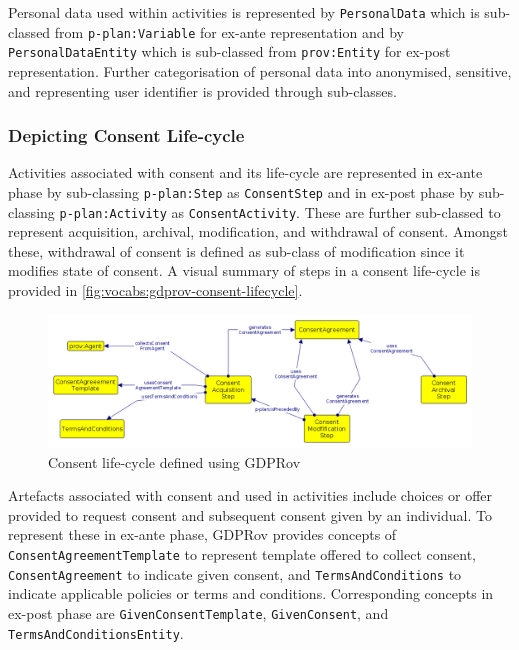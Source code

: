 Personal data used within activities is represented by \texttt{PersonalData} which is sub-classed from \texttt{p-plan:Variable} for ex-ante representation and by \texttt{PersonalDataEntity} which is sub-classed from \texttt{prov:Entity} for ex-post representation.
Further categorisation of personal data into anonymised, sensitive, and representing user identifier is provided through sub-classes.

\subsubsection{Depicting Consent Life-cycle}
Activities associated with consent and its life-cycle are represented in ex-ante phase by sub-classing \texttt{p-plan:Step} as \texttt{ConsentStep} and in ex-post phase by sub-classing \texttt{p-plan:Activity} as \texttt{ConsentActivity}.
These are further sub-classed to represent acquisition, archival, modification, and withdrawal of consent.
Amongst these, withdrawal of consent is defined as sub-class of modification since it modifies state of consent.
A visual summary of steps in a consent life-cycle is provided in \autoref{fig:vocabs:gdprov-consent-lifecycle}.
\begin{figure}[htbp]
    \centering
    \includegraphics[width=\linewidth]{img/GDPRov_consent_lifecycle.png}
    \caption{Consent life-cycle defined using GDPRov}
    \label{fig:vocabs:gdprov-consent-lifecycle}
\end{figure}

Artefacts associated with consent and used in activities include choices or offer provided to request consent and subsequent consent given by an individual.
To represent these in ex-ante phase, GDPRov provides concepts of \texttt{ConsentAgreementTemplate} to represent template offered to collect consent, \texttt{ConsentAgreement} to indicate given consent, and \texttt{TermsAndConditions} to indicate applicable policies or terms and conditions.
Corresponding concepts in ex-post phase are \texttt{GivenConsentTemplate}, \texttt{GivenConsent}, and \texttt{TermsAndConditionsEntity}.

